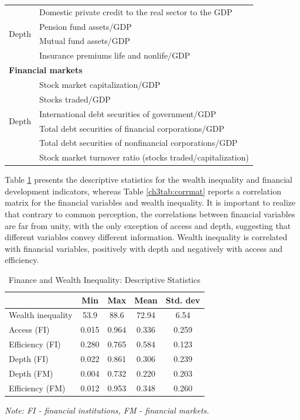 \begin{refsection}
\begin{table}[ht!]
\begin{tabular}{ll}
  \midrule
  \multirow{4}{*}{Depth}	& Domestic private credit to the real sector to the GDP \\
  							& Pension fund assets/GDP \\
  							& Mutual fund assets/GDP \\
  							& Insurance premiums life and nonlife/GDP \\
  \midrule
  \multicolumn{2}{l}{\textbf{Financial markets}} \\
  \midrule
  \multirow{6}{*}{Depth} 	& Stock market capitalization/GDP \\
  							& Stocks traded/GDP \\
  							& International debt securities of government/GDP \\
  							& Total debt securities of financial corporations/GDP \\
  							& Total debt securities of nonfinancial corporations/GDP \\
  \midrule
  Efficiency			& Stock market turnover ratio (stocks traded/capitalization) \\
  \bottomrule
\end{tabular}
\end{table}
%
%
%
Table \ref{ch3tab:descstat} presents the descriptive statistics for the wealth inequality and financial development indicators, whereas Table \ref{ch3tab:corrmat} reports a correlation matrix for the financial variables and wealth inequality. It is important to realize that contrary to common perception, the correlations between financial variables are far from unity, with the only exception of access and depth, suggesting that different variables convey different information. Wealth inequality is correlated with financial variables, positively with depth and negatively with access and efficiency.
%
%
\begin{table}[ht!]
\small
\centering
\caption{Finance and Wealth Inequality: Descriptive Statistics}
\label{ch3tab:descstat}
\begin{threeparttable}
\begin{tabular}{lcccc}
  \toprule
							& Min & Max & Mean & Std. dev \\ 
  \midrule
  Wealth inequality	& 53.9 & 88.6 &  72.94 & 6.54  \\ 
  Access (FI)		& 0.015 & 0.964 & 0.336 & 0.259 \\ 
  Efficiency (FI)   & 0.280 & 0.765 & 0.584 & 0.123 \\ 
  Depth (FI)		& 0.022 & 0.861 & 0.306 & 0.239 \\ 
  Depth (FM) 		& 0.004 & 0.732 & 0.220 & 0.203 \\ 
  Efficiency (FM)	& 0.012 & 0.953 & 0.348 & 0.260 \\ 
  \bottomrule
\end{tabular}
\begin{tablenotes}
\footnotesize
\item \textit{Note: FI - financial institutions, FM - financial markets.}
\end{tablenotes}
\end{threeparttable}
\end{table}


\end{refsection}
